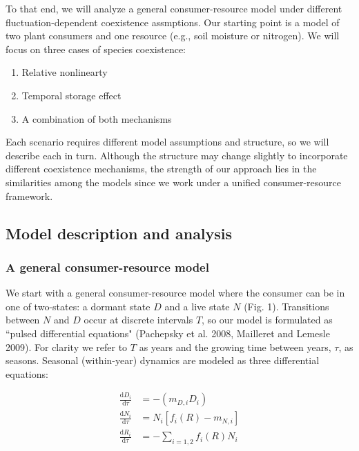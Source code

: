 \documentclass[12pt,]{article}
\begin{document}
To that end, we will analyze a general consumer-resource model under
different fluctuation-dependent coexistence assmptions. Our starting
point is a model of two plant consumers and one resource (e.g., soil
moisture or nitrogen). We will focus on three cases of species
coexistence:

\begin{enumerate}
  \item Relative nonlinearty
  \item Temporal storage effect
  \item A combination of both mechanisms
\end{enumerate}

Each scenario requires different model assumptions and structure, so we
will describe each in turn. Although the structure may change slightly
to incorporate different coexistence mechanisms, the strength of our
approach lies in the similarities among the models since we work under a
unified consumer-resource framework.

\subsection{Model description and
analysis}\label{model-description-and-analysis}

\subsubsection{A general consumer-resource
model}\label{a-general-consumer-resource-model}

We start with a general consumer-resource model where the consumer can
be in one of two-states: a dormant state \(D\) and a live state \(N\)
(Fig. 1). Transitions between \(N\) and \(D\) occur at discrete
intervals \(T\), so our model is formulated as ``pulsed differential
equations" (Pachepsky et al. 2008, Mailleret and Lemesle 2009). For
clarity we refer to \(T\) as years and the growing time between years,
\(\tau\), as seasons. Seasonal (within-year) dynamics are modeled as
three differential equations:

\begin{align}
\frac{\text{d}D_{i}}{\text{d}\tau} &= -(m_{D,i}D_{i})\\
\frac{\text{d}N_{i}}{\text{d}\tau} &= N_{i}[f_{i}(R) - m_{N,i}]\\
\frac{\text{d}R_{i}}{\text{d}\tau} &= - \sum\limits_{i=1,2}f_{i}(R)N_{i}
\end{align}
\end{document}
